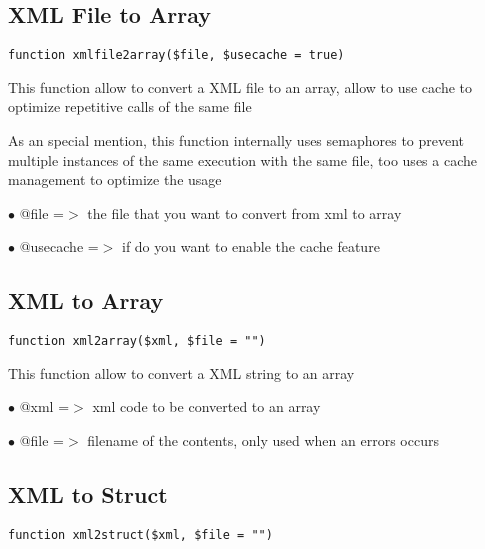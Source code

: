 \documentclass[a4paper]{book}
\begin{document}
\subsection{XML File to Array}

\begin{lstlisting}
function xmlfile2array($file, $usecache = true)
\end{lstlisting}

This function allow to convert a XML file to an array, allow to use cache to
optimize repetitive calls of the same file

As an special mention, this function internally uses semaphores to prevent
multiple instances of the same execution with the same file, too uses a cache
management to optimize the usage

\begin{compactitem}
\item[\color{myblue}$\bullet$] @file     =$>$ the file that you want to convert from xml to array
\item[\color{myblue}$\bullet$] @usecache =$>$ if do you want to enable the cache feature
\end{compactitem}

\hypertarget{toc299}{}
\subsection{XML to Array}

\begin{lstlisting}
function xml2array($xml, $file = "")
\end{lstlisting}

This function allow to convert a XML string to an array

\begin{compactitem}
\item[\color{myblue}$\bullet$] @xml  =$>$ xml code to be converted to an array
\item[\color{myblue}$\bullet$] @file =$>$ filename of the contents, only used when an errors occurs
\end{compactitem}

\hypertarget{toc300}{}
\subsection{XML to Struct}

\begin{lstlisting}
function xml2struct($xml, $file = "")
\end{lstlisting}
\end{document}
